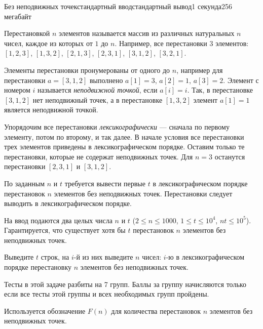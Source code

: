 \begin{problem}{Без неподвижных точек}{стандартный ввод}{стандартный вывод}{1 секунда}{256 мегабайт}

Перестановкой $n$ элементов называется массив из различных натуральных $n$ чисел, каждое из которых от $1$ до $n$. Например, все перестановки $3$ элементов: $[1, 2, 3]$, $[1, 3, 2]$, $[2, 1, 3]$, $[2, 3, 1]$, $[3, 1, 2]$, $[3, 2, 1]$.

Элементы перестановки пронумерованы от одного до $n$, например для перестановки $a = [3, 1, 2]$ выполнено
$a[1] = 3$, $a[2] = 1$, $a[3] = 2$. Элемент с номером $i$ называется \textit{неподвижной точкой},
если $a[i] = i$. Так, в перестановке $[3, 1, 2]$ нет неподвижный точек, а в перестановке $[1, 3, 2]$ элемент
$a[1] = 1$ является неподвижной точкой.

Упорядочим все перестановки \textit{лексикографически} --- сначала по первому элементу,
потом по второму, и так далее. В начале условия все перестановки трех элементов приведены
в лексикографическом порядке. Оставим только те перестановки, которые не содержат неподвижных
точек. Для $n = 3$ останутся перестановки $[2, 3, 1]$ и $[3, 1, 2]$.

По заданным $n$ и $t$ требуется вывести первые $t$ в лексикографическом порядке
перестановок $n$ элементов без неподвижных точек. Перестановки следует выводить в лексикографическом порядке.

\InputFile
На ввод подаются два целых числа $n$ и $t$ ($2 \le n \le 1000$, $1 \le t \le 10^4$, $nt \le 10^5$). Гарантируется, что существует хотя бы $t$ перестановок $n$ элементов без неподвижных точек.

\OutputFile
Выведите $t$ строк, на $i$-й из них выведите $n$ чисел: $i$-ю в лексикографическом порядке перестановку $n$ элементов без неподвижных точек. 

\Scoring
Тесты в этой задаче разбиты на 7 групп. Баллы за группу начисляются только если
все тесты этой группы и всех необходимых групп пройдены.

Используется обозначение $F(n)$ для количества перестановок $n$ элементов без неподвижных точек.

\medskip


\end{problem}
